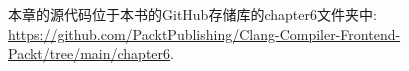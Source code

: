 
本章的源代码位于本书的GitHub存储库的chapter6文件夹中: \url{https://github.com/PacktPublishing/Clang-Compiler-Frontend-Packt/tree/main/chapter6}.

